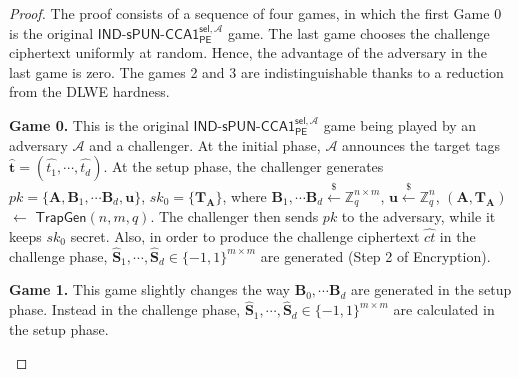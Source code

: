 \documentclass[runningheads,10pt]{llncs}
\begin{document}
\fi



















\iffalse


\begin{proof}
	The proof consists of a sequence of four games, in which the first Game 0 is 
	the original  $\mathsf{IND}$-$\mathsf{sPUN}$-$\mathsf{CCA1}^{\mathsf{sel},\mathcal{A}}_{\mathsf{PE}}$ game.
	The last game chooses the challenge ciphertext uniformly at random.
	Hence, the advantage of the adversary in the last game is zero.
	The games 2 and 3 are indistinguishable thanks to a reduction from the DLWE hardness.
	\begin{description}
		\item  \textbf{Game 0.} This is the original  $\mathsf{IND}$-$\mathsf{sPUN}$-$\mathsf{CCA1}^{\mathsf{sel},\mathcal{A}}_{\mathsf{PE}}$ 
		game being played by an adversary $\mathcal{A}$ and a challenger. 
		At the initial phase, $\mathcal{A}$ announces the target tags  $\widehat{\mathbf{t}}=(\widehat{t_1}, \cdots, \widehat{t_d})$. 
		At the setup phase, the challenger generates $pk=\{\textbf{A},\textbf{B}_1, \cdots \textbf{B}_d , \textbf{u}\}$, 
		$sk_0=\{\textbf{T}_\textbf{A}\}$, where $\textbf{B}_1, \cdots \textbf{B}_d \xleftarrow{\$} \mathbb{Z}_q^{n \times m}$, 
		$\textbf{u} \xleftarrow{\$} \mathbb{Z}_q^{n}$, $(\textbf{A}, \textbf{T}_\textbf{A})$ $\leftarrow$ $\textsf{TrapGen}(n,m,q)$. 
		The challenger then sends $pk$ to the adversary, while it keeps $sk_0$ secret. 
		Also, in order to produce the challenge ciphertext $\widehat{ct}$ in the challenge phase, 
		$\widehat{\textbf{S}}_1, \cdots, \widehat{\textbf{S}}_{d} \in \{-1,1\}^{m \times m}$ are generated (Step 2 of \textsf{Encryption}). 
		\item \textbf{Game 1.} This game slightly changes the way $\textbf{B}_0, \cdots \textbf{B}_d$ are generated in the setup phase. 
		Instead in the challenge phase, $\widehat{\textbf{S}}_1, \cdots, \widehat{\textbf{S}}_{d} \in \{-1,1\}^{m \times m}$ are calculated in the setup phase.

\end{description}
\end{proof}
\end{document}
